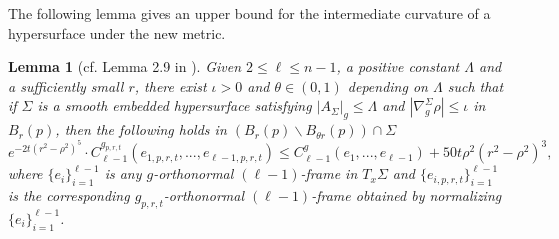 \documentclass[11pt]{amsart}
\DeclareMathOperator{\Ric}{Ric}
\newtheorem{lemma}[theorem]{Lemma}
\theoremstyle{definition}
\theoremstyle{remark}
\numberwithin{equation}{section}
\begin{document}
    The following lemma gives an upper bound for the intermediate curvature of a hypersurface under
      the new metric. 
    \begin{lemma}[cf. Lemma 2.9 in \cite{chuleezhu_n_systole}]\label{C_m-1_upper}
        Given $2\leq \ell\leq n-1$, a positive constant $\Lambda$ and a sufficiently small $r$, there
          exist $\iota>0$ and $\theta\in(0,1)$ depending on $\Lambda$ such that if $\Sigma$ is a
          smooth embedded hypersurface satisfying $|A_\Sigma|_g\leq \Lambda$ and
          $|\nabla_{g}^{\Sigma}\rho|\leq \iota$ in $B_{r}(p)$, then the following holds in
          $(B_{r}(p)\backslash B_{\theta r}(p))\cap \Sigma$
        \[
            e^{-2t(r^{2}-\rho^2)^5}\cdot
              C_{\ell-1}^{g_{p,r,t}}(e_{1,p,r,t},...,e_{\ell-1,p,r,t})\leq
              C_{\ell-1}^{g}(e_{1},...,e_{\ell-1})+50 t \rho^2(r^2-\rho^2)^{3},
        \]
        where $\{e_{i}\}_{i=1}^{\ell-1}$ is any $g$-orthonormal $(\ell-1)$-frame in
          $T_x\Sigma$ and $\{e_{i,p,r,t}\}_{i=1}^{\ell-1}$ is the corresponding
          $g_{p,r,t}$-orthonormal $(\ell-1)$-frame obtained by normalizing
          $\{e_i\}_{i=1}^{\ell-1}$. 
    \end{lemma}
\end{document}
